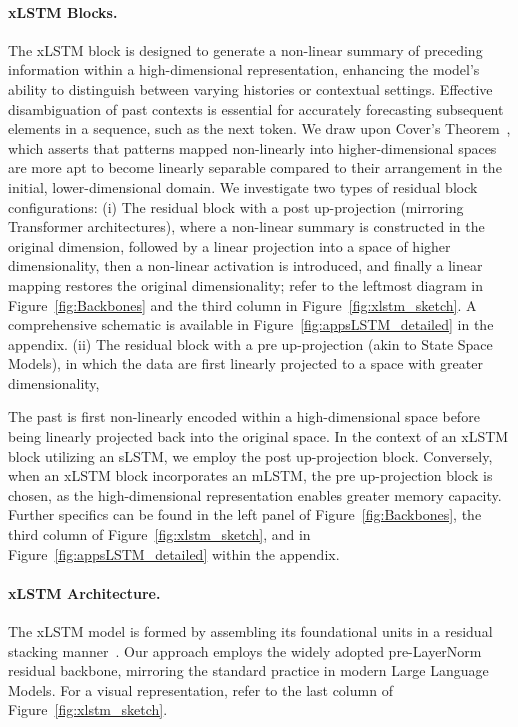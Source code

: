 \paragraph{xLSTM Blocks.}
\label{sec:xLSTMblock}
The xLSTM block is designed to generate a non-linear summary of preceding information within a high-dimensional representation, enhancing the model's ability to distinguish between varying histories or contextual settings. Effective disambiguation of past contexts is essential for accurately forecasting subsequent elements in a sequence, such as the next token. We draw upon Cover’s Theorem~\citep{Cover:65}, which asserts that patterns mapped non-linearly into higher-dimensional spaces are more apt to become linearly separable compared to their arrangement in the initial, lower-dimensional domain. We investigate two types of residual block configurations: (i) The residual block with a post up-projection (mirroring Transformer architectures), where a non-linear summary is constructed in the original dimension, followed by a linear projection into a space of higher dimensionality, then a non-linear activation is introduced, and finally a linear mapping restores the original dimensionality; refer to the leftmost diagram in Figure~\ref{fig:Backbones} and the third column in Figure~\ref{fig:xlstm_sketch}. A comprehensive schematic is available in Figure~\ref{fig:appsLSTM_detailed} in the appendix. (ii) The residual block with a pre up-projection (akin to State Space Models), in which the data are first linearly projected to a space with greater dimensionality,

The past is first non-linearly encoded within a high-dimensional space before being linearly projected back into the original space. In the context of an xLSTM block utilizing an sLSTM, we employ the post up-projection block. Conversely, when an xLSTM block incorporates an mLSTM, the pre up-projection block is chosen, as the high-dimensional representation enables greater memory capacity. Further specifics can be found in the left panel of Figure~\ref{fig:Backbones}, the third column of Figure~\ref{fig:xlstm_sketch}, and in Figure~\ref{fig:appsLSTM_detailed} within the appendix.

\paragraph{xLSTM Architecture. }
\label{sec:xLSTMarchitecure}
The xLSTM model is formed by assembling its foundational units in a residual stacking manner~\citep{Srivastava:15,He:16}. Our approach employs the widely adopted pre-LayerNorm~\citep{Ba:16b} residual backbone, mirroring the standard practice in modern Large Language Models. For a visual representation, refer to the last column of Figure~\ref{fig:xlstm_sketch}.

